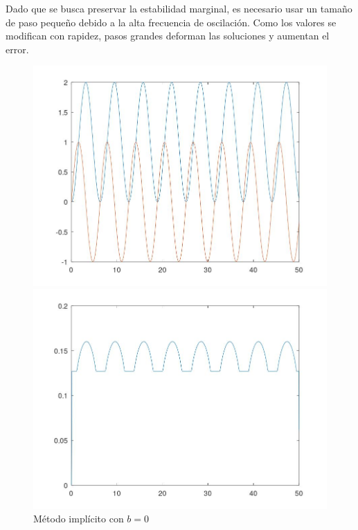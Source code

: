 \documentclass[a4paper,12pt]{article}
\begin{document}
Dado que se busca preservar la estabilidad marginal, es necesario usar un tamaño de paso pequeño debido a la alta frecuencia de oscilación. Como los valores se modifican con rapidez, pasos grandes deforman las soluciones y aumentan el error.

\begin{figure}[H]
\centering
\begin{minipage}[b]{0.49\textwidth}
    \centering
    \includegraphics[width=\textwidth]{img/ej11_5.jpeg}
\end{minipage}
\hfill
\begin{minipage}[b]{0.49\textwidth}
    \centering
    \includegraphics[width=\textwidth]{img/ej11_6.jpeg}
\end{minipage}
\caption{Método implícito con \( b = 0 \)}
\end{figure}
\end{document}
